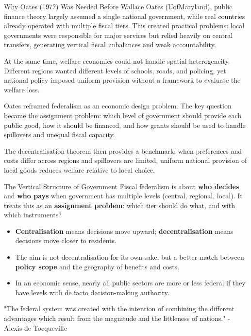 \documentclass[10pt]{beamer}
\begin{document}
\begin{frame}[allowframebreaks]{Why Oates (1972) Was Needed}
Before Wallace Oates (UofMaryland), public finance theory largely assumed a single national government, while real countries already operated with multiple fiscal tiers.
This created practical problems: local governments were responsible for major services but relied heavily on central transfers, generating vertical fiscal imbalances and weak accountability.

At the same time, welfare economics could not handle spatial heterogeneity.
Different regions wanted different levels of schools, roads, and policing, yet national policy imposed uniform provision without a framework to evaluate the welfare loss.

Oates reframed federalism as an economic design problem.
The key question became the assignment problem: which level of government should provide each public good, how it should be financed, and how grants should be used to handle spillovers and unequal fiscal capacity.

The decentralisation theorem then provides a benchmark: when preferences and costs differ across regions and spillovers are limited, uniform national provision of local goods reduces welfare relative to local choice.
\end{frame}


\begin{frame}{The Vertical Structure of Government}
Fiscal federalism is about \textbf{who decides} and \textbf{who pays} when government has multiple levels (central, regional, local).
It treats this as an \textbf{assignment problem}: which tier should do what, and with which instruments?

\begin{itemize}
\item \textbf{Centralisation} means decisions move upward; \textbf{decentralisation} means decisions move closer to residents.
\item The aim is not decentralisation for its own sake, but a better match between \textbf{policy scope} and the geography of benefits and costs.
\item In an economic sense, nearly all public sectors are more or less federal if they have levels with de facto decision-making authority.
\end{itemize}

\vspace{0.25cm}
\footnotesize
\alert{"The federal system was created with the intention of combining the different advantages which result from the magnitude and the littleness of nations." - Alexis de Tocqueville}
\end{frame}
\end{document}
